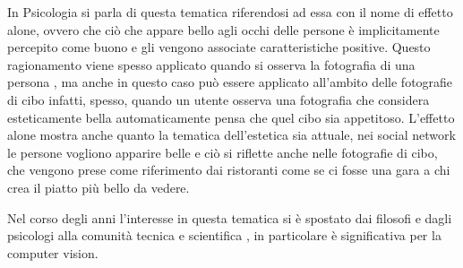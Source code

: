 In Psicologia si parla di questa tematica riferendosi ad essa con il nome di effetto alone, ovvero che ciò che appare bello agli occhi delle persone è implicitamente percepito come buono e gli vengono associate caratteristiche positive. Questo ragionamento viene spesso applicato quando si osserva la fotografia di una persona \cite{citation-0}, ma anche in questo caso può essere applicato all'ambito delle fotografie di cibo infatti, spesso, quando un utente osserva una fotografia che considera esteticamente bella automaticamente pensa che quel cibo sia appetitoso. L'effetto alone mostra anche quanto la tematica dell'estetica sia attuale, nei social network le persone vogliono apparire belle e ciò si riflette anche nelle fotografie di cibo, che vengono prese come riferimento dai ristoranti come se ci fosse una gara a chi crea il piatto più bello da vedere.

Nel corso degli anni l'interesse in questa tematica si è spostato dai filosofi e dagli psicologi alla comunità tecnica e scientifica \cite{mikhailava2020aesthetic}, in particolare è significativa per la computer vision. 

